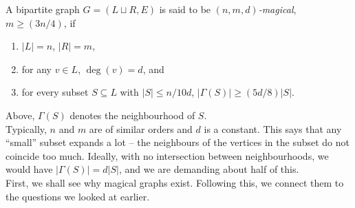 			\begin{fdef}
				A bipartite graph $G = (L\sqcup R, E)$ is said to be \emph{$(n,m,d)$-magical}, $m \ge (3n/4)$, if
				\begin{enumerate}
					\item $|L|=n$, $|R|=m$,
					\item for any $v \in L$, $\deg(v) = d$, and
					\item for every subset $S \subseteq L$ with $|S| \le n/10d$, $|\Gamma(S)| \ge (5d/8)|S|$.
				\end{enumerate}
			\end{fdef}

			Above, $\Gamma(S)$ denotes the neighbourhood of $S$.\\
			Typically, $n$ and $m$ are of similar orders and $d$ is a constant.
			This says that any ``small'' subset expands a lot -- the neighbours of the vertices in the subset do not coincide too much. Ideally, with no intersection between neighbourhoods, we would have $|\Gamma(S)| = d|S|$, and we are demanding about half of this.\\
			First, we shall see why magical graphs exist. Following this, we connect them to the questions we looked at earlier.\\

